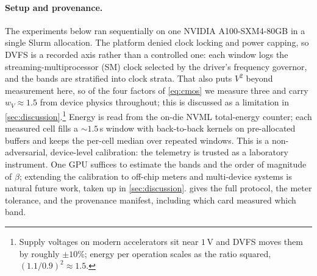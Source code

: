 \documentclass{article}
\theoremstyle{plain}
\theoremstyle{definition}
\theoremstyle{remark}
\begin{document}
\paragraph{Setup and provenance.}
The experiments below ran sequentially on one NVIDIA A100-SXM4-80GB in a single
Slurm allocation. The platform denied clock locking and power capping, so DVFS is a
recorded axis rather than a controlled one: each window logs the
streaming-multiprocessor (SM) clock selected by the driver's frequency
governor, and the bands are stratified into clock strata. That also puts $V^2$ beyond measurement here, so of the four factors of
\cref{eq:cmos} we measure three and carry $w_V \approx 1.5$ from device physics
throughout; this is discussed as a limitation in \cref{sec:discussion}.\footnote{Supply
voltages on modern accelerators sit near $1$\,V \citep{horowitz2014computing}
and DVFS moves them by roughly $\pm 10\%$; energy per operation scales as the
ratio squared, $(1.1/0.9)^2 \approx 1.5$.}
Energy is read from the on-die NVML total-energy counter; each
measured cell fills a ${\sim}1.5$\,s window with back-to-back kernels on
pre-allocated buffers and keeps the per-cell median over repeated
windows. This is a non-adversarial, device-level calibration: the
telemetry is trusted as a laboratory instrument. One GPU
suffices to estimate the bands and the order of magnitude of $\beta$;
extending the calibration to off-chip meters and multi-device systems is
natural future work, taken up in \cref{sec:discussion}.  gives the full protocol, the meter
tolerance, and the provenance manifest, including which card measured
which band.
\end{document}
